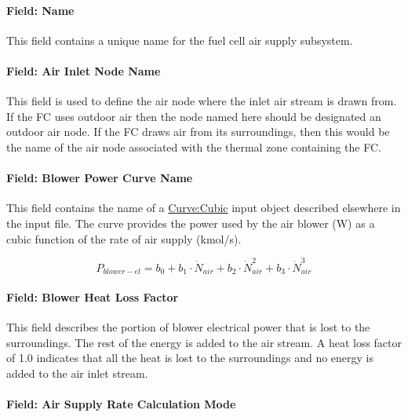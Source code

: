 \paragraph{Field: Name}\label{field-name-16-001}

This field contains a unique name for the fuel cell air supply subsystem.

\paragraph{Field: Air Inlet Node Name}\label{field-air-inlet-node-name-1-000}

This field is used to define the air node where the inlet air stream is drawn from. If the FC uses outdoor air then the node named here should be designated an outdoor air node. If the FC draws air from its surroundings, then this would be the name of the air node associated with the thermal zone containing the FC.

\paragraph{Field: Blower Power Curve Name}\label{field-blower-power-curve-name}

This field contains the name of a \hyperref[curvecubic]{Curve:Cubic} input object described elsewhere in the input file. The curve provides the power used by the air blower (W) as a cubic function of the rate of air supply (kmol/s).

\begin{equation}
{P_{blower - el}} = {b_0} + {b_1} \cdot {\dot N_{air}} + {b_2} \cdot \dot N_{air}^2 + {b_3} \cdot \dot N_{air}^3
\end{equation}

\paragraph{Field: Blower Heat Loss Factor}\label{field-blower-heat-loss-factor}

This field describes the portion of blower electrical power that is lost to the surroundings. The rest of the energy is added to the air stream. A heat loss factor of 1.0 indicates that all the heat is lost to the surroundings and no energy is added to the air inlet stream.

\paragraph{Field: Air Supply Rate Calculation Mode}\label{field-air-supply-rate-calculation-mode}

